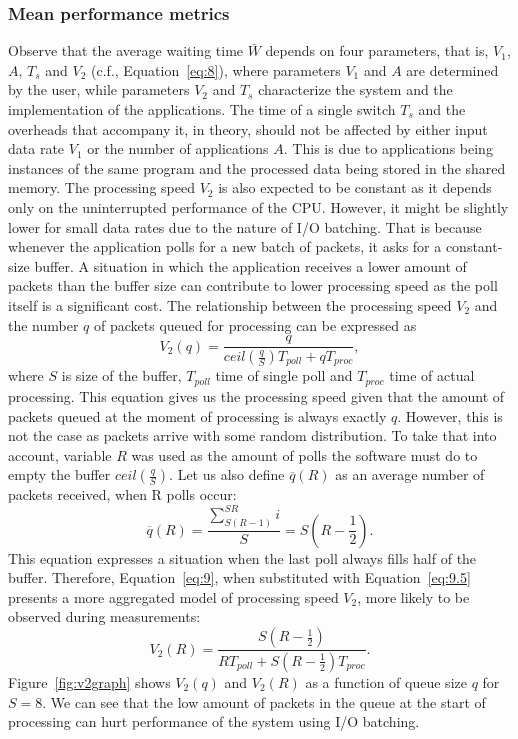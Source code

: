 \documentclass[english]{kththesis}
\begin{document}
\subsubsection{Mean performance metrics}
\label{sec:expectations}
Observe that the average waiting time \(\bar{W}\) depends on four parameters, that is, \(V_1\), \(A\), \(T_s\) and \(V_2\) (c.f., Equation~\ref{eq:8}), where parameters \(V_1\) and \(A\) are determined by the user, while parameters \(V_2\) and \(T_s\) characterize the system and the implementation of the applications.
The time of a single switch \(T_s\) and the overheads that accompany it, in theory, should not be affected by either input data rate \(V_1\) or the number of applications \(A\). This is due to applications being instances of the same program and the processed data being stored in the shared memory.
The processing speed \(V_2\) is also expected to be constant as it depends only on the uninterrupted performance of the CPU. However, it might be slightly lower for small data rates due to the nature of I/O batching. That is because whenever the application polls for a new batch of packets, it asks for a constant-size buffer. A situation in which the application receives a lower amount of packets than the buffer size can contribute to lower processing speed as the poll itself is a significant cost. The relationship between the processing speed \(V_2\) and the number \(q\) of packets queued for processing can be expressed as
\begin{equation}
\label{eq:9}
V_2(q) = \frac{q}{ceil\left(\frac{q}{S}\right)T_{poll} + qT_{proc}},
\end{equation}
where \(S\) is size of the buffer, \(T_{poll}\) time of single poll and \(T_{proc}\) time of actual processing. This equation gives us the processing speed given that the amount of packets queued at the moment of processing is always exactly \(q\). However, this is not the case as packets arrive with some random distribution. To take that into account, variable \(R\) was used as the amount of polls the software must do to empty the buffer \(ceil\left(\frac{q}{S}\right)\). Let us also define \(\overline{q}(R)\) as an average number of packets received, when R polls occur:
\begin{equation}
\label{eq:9.5}
\overline{q}(R) = \frac{\sum_{S(R-1)}^{SR} i}{S} = S(R-\frac{1}{2}).
\end{equation}
This equation expresses a situation when the last poll always fills half of the buffer. Therefore, Equation~\ref{eq:9}, when substituted with Equation~\ref{eq:9.5} presents a more aggregated model of processing speed \(V_2\), more likely to be observed during measurements:
\begin{equation}
\label{eq:10}
V_2(R) = \frac{S \left(R - \frac{1}{2}\right)}
           {RT_{poll} + S \left(R - \frac{1}{2}\right)T_{proc}}.
\end{equation}
Figure~\ref{fig:v2graph} shows \(V_2(q)\) and \(V_2(R)\) as a function of queue size \(q\) for \(S = 8\). We can see that the low amount of packets in the queue at the start of processing can hurt performance of the system using I/O batching.
\end{document}
